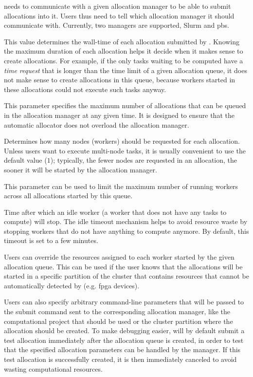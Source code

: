 \begin{description}[wide=0pt,itemsep=0pt,topsep=2pt]
	\item[Allocation manager] \Autoalloc{} needs to communicate with a given allocation manager
		to be able to submit allocations into it. Users thus need to tell \hq{} which
		allocation manager it should communicate with. Currently, two managers are supported, Slurm and
		\gls{pbs}.
	\item[Time limit] This value determines the wall-time of each allocation submitted by \autoalloc{}.
		Knowing the maximum duration of each allocation helps it decide when it makes sense to create
		allocations. For example, if the only tasks waiting to be computed have a \emph{time request}
		that is longer than the time limit of a given allocation queue, it does not make sense to create
		allocations in this queue, because workers started in these allocations could not execute such
		tasks anyway.
	\item[Backlog] This parameter specifies the maximum number of allocations that can be queued in the allocation
		manager at any given time. It is designed to ensure that the automatic allocator does not overload
		the allocation manager.
	\item[Worker count per allocation] Determines how many nodes (workers) should be requested for each allocation. Unless users want to
		execute multi-node tasks, it is usually convenient to use the default value
		($1$); typically, the fewer nodes are requested in an allocation, the sooner it
		will be started by the allocation manager.
	\item[Max worker count] This parameter can be used to limit the maximum number of running workers across all allocations
		started by this queue.
	\item[Idle timeout] Time after which an idle worker (a worker that does not have any tasks to compute) will stop. The
		idle timeout mechanism helps to avoid resource waste by stopping workers that do not have anything
		to compute anymore. By default, this timeout is set to a few minutes.
	\item[Worker resources] Users can override the resources assigned to each worker started by the given allocation queue.
		This can be used if the user knows that the allocations will be started in a specific partition of
		the cluster that contains resources that cannot be automatically detected by
		\hyperqueue{} (e.g. \gls{fpga} devices).
	\item[Custom allocation parameters] Users can also specify arbitrary command-line parameters that will be passed to the submit command
		sent to the corresponding allocation manager, like the computational project that should be used or
		the cluster partition where the allocation should be created. To make debugging easier,
		\hyperqueue{} will by default submit a test allocation immediately after the allocation
		queue is created, in order to test that the specified allocation parameters can be handled by the
		manager. If this test allocation is successfully created, it is then immediately canceled to avoid
		wasting computational resources.
\end{description}

